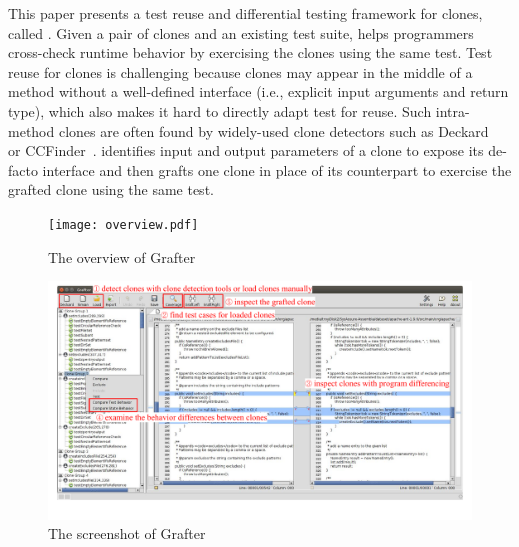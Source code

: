 This paper presents a test reuse and differential testing framework for clones, called {\grafter}. Given a pair of clones and an existing test suite, {\grafter} helps programmers cross-check runtime behavior by exercising the clones using the same test. Test reuse for clones is challenging because clones may appear in the middle of a method without a well-defined interface (i.e., explicit input arguments and return type), which also makes it hard to directly adapt test for reuse. Such intra-method clones are often found by widely-used clone detectors such as Deckard~\cite{Jiang2007} or CCFinder~\cite{Kamiya2002}. {\grafter} identifies input and output parameters of a clone to expose its de-facto interface and then grafts one clone in place of its counterpart to exercise the grafted clone using the same test.

\begin{figure}[!t]
\centering
\texttt{[image: overview.pdf]}
\caption{The overview of Grafter}
\label{fig:output}
\vspace{-4mm}
\end{figure}

%

\begin{figure}[!th]
\centering
\includegraphics[width=\linewidth]{grafter-screenshot-v3.pdf}
\caption{The screenshot of Grafter}
\label{fig:screenshot}
\end{figure}

